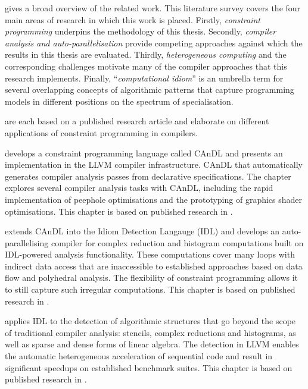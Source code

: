    {\bf{}} gives a broad overview of the related work.
    This literature survey covers the four main areas of research in which this
    work is placed.
    Firstly, {\em constraint programming} underpins the methodology of this
    thesis.
    Secondly, {\em compiler analysis and auto-parallelisation} provide
    competing approaches against which the results in this thesis are evaluated.
    Thirdly, {\em heterogeneous computing} and the corresponding challenges
    motivate many of the compiler approaches that this research implements.
    Finally, ``{\em computational idiom}'' is an umbrella term for several
    overlapping concepts of algorithmic patterns that capture programming models
    in different positions on the spectrum of specialisation.

    {\bf{}}
    are each based on a published research article and elaborate on different
    applications of constraint programming in compilers.

    {\bf{}} develops a constraint programming language called
    CAnDL and presents an implementation in the LLVM compiler infrastructure.
    CAnDL that automatically generates compiler analysis passes from
    declarative specifications.
    The chapter explores several compiler analysis tasks with CAnDL,
    including the rapid implementation of peephole optimisations and the
    prototyping of graphics shader optimisations.
    This chapter is based on published research in
    \citet{Ginsbach:2018:CDS:3178372.3179515}.

    {\bf{}} extends CAnDL into the Idiom Detection
    Langauge (IDL) and develops an auto-parallelising compiler for
    complex reduction and histogram computations built on IDL-powered analysis
    functionality.
    These computations cover many loops with indirect data access that are
    inaccessible to established approaches based on data flow and polyhedral
    analysis.
    The flexibility of constraint programming allows it to still capture such
    irregular computations.
    This chapter is based on published research in
    \citet{ginsbach2017discovery}.

    {\bf{}} applies IDL to the detection of algorithmic
    structures that go beyond the scope of traditional compiler analysis:
    stencils, complex reductions and histograms, as well as sparse and dense
    forms of linear algebra.
    The detection in LLVM enables the automatic heterogeneous
    acceleration of sequential code and result in significant speedups on
    established benchmark suites.
    This chapter is based on published research in
    \citet{Ginsbach:2018:AML:3173162.3173182}.
